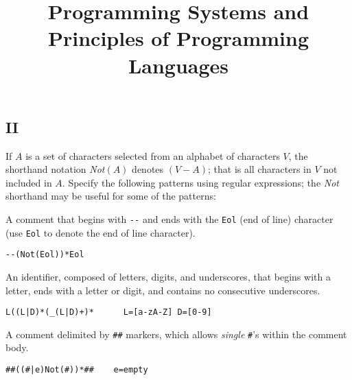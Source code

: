 \withmodelanswers               %

\begin{preamble}
\part{II}
\title{Programming Systems and Principles of Programming Languages}
\end{preamble}

\begin{questions}


\question

\newenvironment{bnf}{
    \begin{tabbing}
    XXXXXXX \= XXXX \= XXXXXXXXXXXXXXXXXXXXXXXXXXXXXXXXXX\kill}{
    \end{tabbing}
    }

\newcommand{\nt}[1]{{\it #1\/}}
\newcommand{\Or}[1]{\ \ $|$ \ \ #1}
\newcommand{\Rule}[2]{{\it #1} \> $\rightarrow$ \> #2}

\begin{subquestions}
\subquestion
If $A$ is a set of characters selected from an
alphabet of characters $V$, the shorthand notation {\it Not$(A)$} denotes 
$(V - A)$; that is all characters in $V$ not included in $A$.
Specify the following patterns using regular expressions; 
the {\it Not\/} shorthand may be useful for some of the patterns:
\begin{subsubquestions}
\subsubquestion
A comment that begins with \verb"--" and ends with the \verb"Eol" 
(end of line) character (use \verb"Eol" to denote the end of line 
character).

\begin{modelanswer}
\begin{verbatim}
--(Not(Eol))*Eol
\end{verbatim}
\end{modelanswer}
\subsubquestion
An identifier, composed of letters, digits, and underscores, that
begins with a letter, ends with a letter or digit, and contains
no consecutive underscores.
\begin{modelanswer}
\begin{verbatim}
L((L|D)*(_(L|D)+)*      L=[a-zA-Z] D=[0-9]
\end{verbatim}
\end{modelanswer}
\subsubquestion
A comment delimited by \verb"##" markers, which allows {\em single\/}
\verb"#"'s within the comment body.
\begin{modelanswer}
\begin{verbatim}
##((#|e)Not(#))*##    e=empty
\end{verbatim}
\end{modelanswer}
\end{subsubquestions}


\end{subquestions}
\end{questions}
